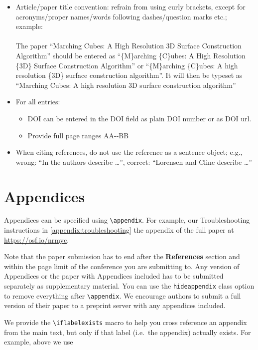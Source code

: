 \documentclass[journal]{vgtc}                     %
\begin{document}
\begin{itemize}
  \item Article/paper title convention: refrain from using curly brackets, except for acronyms/proper names/words following dashes/question marks etc.; example:\\\\
        The paper ``Marching Cubes: A High Resolution 3D Surface Construction Algorithm'' should be entered as ``\{M\}arching \{C\}ubes: A High Resolution \{3D\} Surface Construction Algorithm'' or  ``\{M\}arching \{C\}ubes: A high resolution \{3D\} surface construction algorithm''.
        It will then be typeset as ``Marching Cubes: A high resolution 3D surface construction algorithm''
  \item For all entries:
        \begin{itemize}
  	      \item DOI can be entered in the DOI field as plain DOI number or as DOI url.
  	      \item Provide full page ranges AA-{}-BB
        \end{itemize}
  \item When citing references, do not use the reference as a sentence object; e.g., wrong: ``In \cite{Lorensen:1987:MCA} the authors describe \dots'', correct: ``Lorensen and Cline \cite{Lorensen:1987:MCA} describe \dots''
\end{itemize}

\section{Appendices}
\label{sec:appendices_inst}

Appendices can be specified using \verb|\appendix|.
For example, our Troubleshooting instructions in
  {\cref{appendix:troubleshooting}}
  {the appendix of the full paper at \url{https://osf.io/nrmyc}}.

Note that the paper submission has to end after the \textbf{References} section and within the page limit of the conference you are submitting to.
Any version of Appendices or the paper with Appendices included has to be submitted separately as supplementary material.
You can use the \verb|hideappendix| class option to remove everything after \verb|\appendix|.
We encourage authors to submit a full version of their paper to a preprint server with any appendices included.

We provide the \verb|\iflabelexists| macro to help you cross reference an appendix from the main text, but only if that label (i.e.\ the appendix) actually exists.
For example, above we use 
\end{document}
